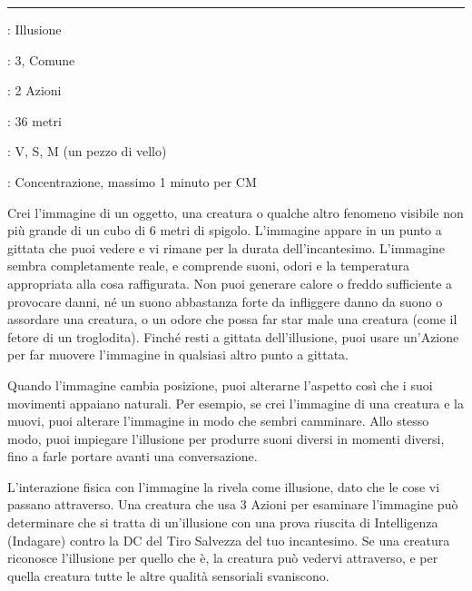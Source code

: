 \begin{multicols}{2}
\smallskip\noindent\rule{\linewidth}{2pt} \hypertarget{Immagine Maggiore}{}\smallskip{}
\noindent
\begin{description}[noitemsep, topsep=0pt, parsep=0pt, partopsep=0pt, leftmargin=0cm, labelwidth=2.8cm]
	\item[\textbf{Lista di Magia}]: Illusione
	\item[\textbf{Livello}]: 3, Comune
	\item[\textbf{T. di Lancio}]: 2 Azioni
	\item[\textbf{Gittata}]: 36 metri
	\item[\textbf{Componenti}]: V, S, M (un pezzo di vello)
	\item[\textbf{Durata}]: Concentrazione, massimo 1 minuto per CM
\end{description}

Crei l'immagine di un oggetto, una creatura o qualche altro fenomeno visibile non più grande di un cubo di 6 metri di spigolo. L'immagine appare in un punto a gittata che puoi vedere e vi rimane per la durata dell'incantesimo. L'immagine sembra completamente reale, e comprende suoni, odori e la temperatura appropriata alla cosa raffigurata. Non puoi generare calore o freddo sufficiente a provocare danni, né un suono abbastanza forte da infliggere danno da suono o assordare una creatura, o un odore che possa far star male una creatura (come il fetore di un troglodita). Finché resti a gittata dell'illusione, puoi usare un'Azione per far muovere l'immagine in qualsiasi altro punto a gittata.

Quando l'immagine cambia posizione, puoi alterarne l'aspetto così che i suoi movimenti appaiano naturali. Per esempio, se crei l'immagine di una creatura e la muovi, puoi alterare l'immagine in modo che sembri camminare. Allo stesso modo, puoi impiegare l'illusione per produrre suoni diversi in momenti diversi, fino a farle portare avanti una conversazione.

L'interazione fisica con l'immagine la rivela come illusione, dato che le cose vi passano attraverso. Una creatura che usa 3 Azioni per esaminare l'immagine può determinare che si tratta di un'illusione con una prova riuscita di Intelligenza (Indagare) contro la DC del Tiro Salvezza del tuo incantesimo. Se una creatura riconosce l'illusione per quello che è, la creatura può vedervi attraverso, e per quella creatura tutte le altre qualità sensoriali svaniscono.


\end{multicols}

